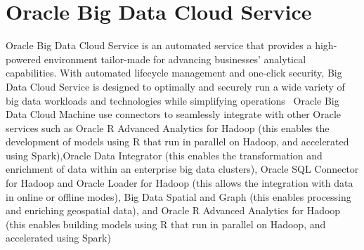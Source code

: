\section{Oracle Big Data Cloud Service}


Oracle Big Data Cloud Service is an automated service that provides a
high-powered environment tailor-made for advancing businesses' analytical
capabilities. With automated lifecycle management and one-click security, Big
Data Cloud Service is designed to optimally and securely run a wide variety of
big data workloads and technologies while simplifying
operations~\cite{hid-sp18-501-OracleCloud} Oracle Big Data Cloud Machine use connectors to
seamlessly integrate with other Oracle services such as Oracle R Advanced
Analytics for Hadoop (this enables the development of models using R that run in
parallel on Hadoop, and accelerated using Spark),Oracle Data Integrator (this
enables the transformation and enrichment of data within an enterprise big data
clusters), Oracle SQL Connector for Hadoop and Oracle Loader for Hadoop (this
allows the integration with data in online or offline modes), Big Data Spatial
and Graph (this enables processing and enriching geospatial data), and Oracle R
Advanced Analytics for Hadoop (this enables building models using R that run in
parallel on Hadoop, and accelerated using Spark)~\cite{hid-sp18-501-OracleCloud}


